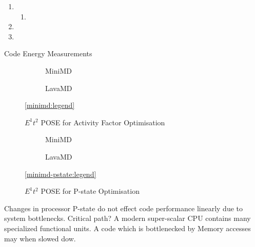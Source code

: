\clearpage

\begin{enumerate}
  \item {}
  \begin{enumerate}
    \item {}
  \end{enumerate}
  \item {}
  \item {}
\end{enumerate}


\begin{table}
\centering
\caption{Code Energy Measurements}
\label{tab:code_metrics}

\end{table}


\begin{figure}[t]%
  \providecommand{\plotwidth}{.95\linewidth}
  \begin{subfigure}[t]{.5\linewidth}%
    \caption{MiniMD}%
  \end{subfigure}%
  \begin{subfigure}[t]{.5\linewidth}%
    \caption{LavaMD}%
  \end{subfigure}%
  \begin{center}%
    \ref{minimd:legend}%
  \end{center}%
  \caption{$E^1t^2$ POSE for Activity Factor Optimisation}%
  \label{fig:minimd}%
\end{figure}

\begin{figure}[t]%
\begin{subfigure}[t]{.5\linewidth}%
\centering%
%
\caption{MiniMD}%
\end{subfigure}%
\begin{subfigure}[t]{.5\linewidth}%
%
\caption{LavaMD}%
\end{subfigure}%
\begin{center}%
\ref{minimd-pstate:legend}%
\end{center}%
\caption{$E^1t^2$ POSE for P-state Optimisation}%
\label{fig:pstates}%
\end{figure}%

Changes in processor P-state do not effect code performance linearly due to system bottlenecks. Critical path?  A modern super-scalar CPU contains many specialized functional units. A code which is bottlenecked by Memory accesses may when slowed dow.

